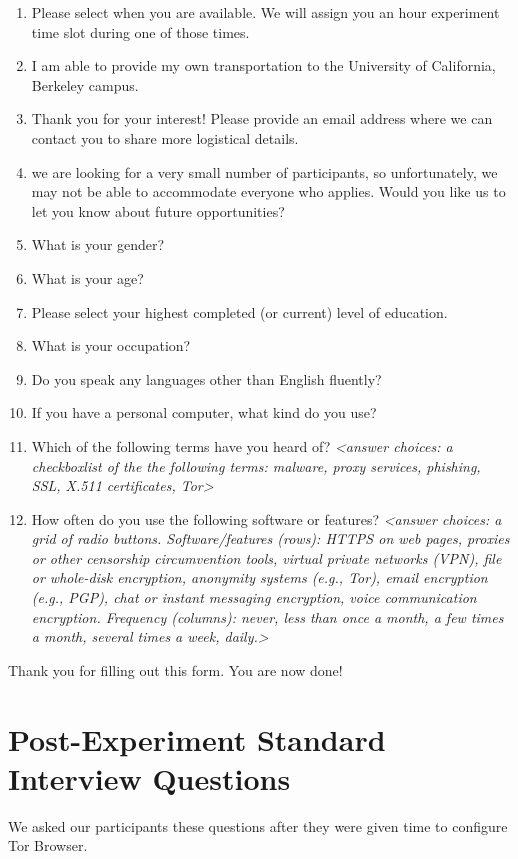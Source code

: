 \documentclass{template}
\begin{document}
\begin{enumerate} \itemsep1pt \parskip0pt  
\item{Please select when you are available. We will assign you an hour experiment time slot during one of those times.}
\item{I am able to provide my own transportation to the University of California, Berkeley campus.}
\item{Thank you for your interest! Please provide an email address where we can contact you to share more logistical details.}
\item{we are looking for a very small number of participants, so unfortunately, we may not be able to accommodate everyone who applies. Would you like us to let you know about future opportunities?}
\item{What is your gender?}
\item{What is your age?}
\item{Please select your highest completed (or current) level of education.}
\item{What is your occupation?} 
\item{Do you speak any languages other than English fluently?}
\item{If you have a personal computer, what kind do you use?}
\item{Which of the following terms have you heard of? \textit{<answer choices: a checkboxlist of the the following terms: malware, proxy services, phishing, SSL, X.511 certificates, Tor>}}
\item{How often do you use the following software or features? \textit{<answer choices: a grid of radio buttons. Software/features (rows): HTTPS on web pages, proxies or other censorship circumvention tools, virtual private networks (VPN), file or whole-disk encryption, anonymity systems (e.g., Tor), email encryption (e.g., PGP), chat or instant messaging encryption, voice communication encryption. Frequency (columns): never, less than once a month, a few times a month, several times a week, daily.>}}
\end{enumerate}
Thank you for filling out this form. You are now done!

\section{Post-Experiment Standard Interview Questions}
We asked our participants these questions after they were given time to configure Tor Browser. 
\end{document}
